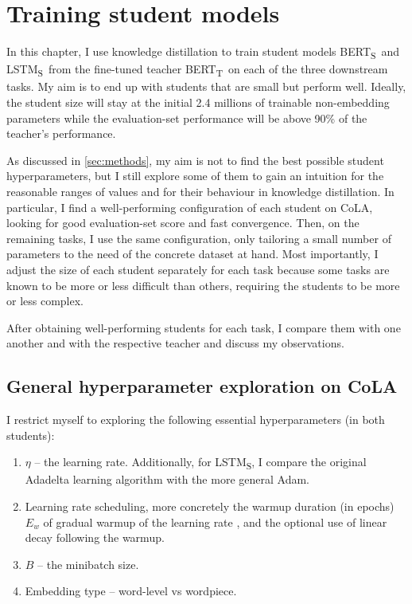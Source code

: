 \documentclass[bsc,frontabs,twoside,singlespacing,parskip,deptreport]{infthesis}
\def\BERTT{BERT\textsubscript{T}}
\def\BERTS{BERT\textsubscript{S}}
\def\LSTMS{LSTM\textsubscript{S}}
\begin{document}
\chapter{Training student models}{
  In this chapter, I use knowledge distillation to train student models \BERTS~and \LSTMS~from the fine-tuned teacher \BERTT~on each of the three downstream tasks.
  My aim is to end up with students that are small but perform well. Ideally, the student size will stay at the initial 2.4 millions of trainable non-embedding parameters while the evaluation-set performance will be above 90\% of the teacher's performance.

  As discussed in \autoref{sec:methods}, my aim is not to find the best possible student hyperparameters, but I still explore some of them to gain an intuition for the reasonable ranges of values and for their behaviour in knowledge distillation.
  In particular, I find a well-performing configuration of each student on CoLA, looking for good evaluation-set score and fast convergence. Then, on the remaining tasks, I use the same configuration, only tailoring a small number of parameters to the need of the concrete dataset at hand. Most importantly, I adjust the size of each student separately for each task because some tasks are known to be more or less difficult than others, requiring the students to be more or less complex.

  After obtaining well-performing students for each task, I compare them with one another and with the respective teacher and discuss my observations.


  \section{General hyperparameter exploration on CoLA}{
    \label{sec:hparam-general}

    I restrict myself to exploring the following essential hyperparameters (in both students):
    \begin{enumerate}
      \item $\eta$ -- the learning rate. Additionally, for \LSTMS, I compare the original Adadelta learning algorithm with the more general Adam.
      \item Learning rate scheduling, more concretely the warmup duration (in epochs) $E_{w}$ of gradual warmup of the learning rate \citep{Goyal_2017}, and the optional use of linear decay following the warmup.
      \item $B$ -- the minibatch size.
      \item Embedding type -- word-level vs wordpiece.
    \end{enumerate}

}}
\end{document}
